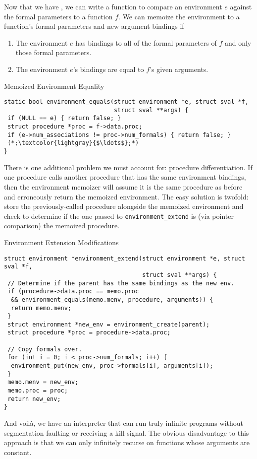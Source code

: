 Now that we have , we can write a function to compare an environment  $e$ against the formal parameters to a function $f$. We can memoize the environment to a function's formal parameters and new argument bindings if
\begin{enumerate}
    \item The environment $e$ has bindings to all of the formal parameters of $f$ and only those formal parameters.
    \item The environment $e$'s bindings are equal to $f$'s given arguments.
\end{enumerate}

\begin{cl}[env.c]{Memoized Environment Equality}
\begin{lstlisting}[language=MyC]
static bool environment_equals(struct environment *e, struct sval *f, 
                               struct sval **args) {
 if (NULL == e) { return false; }
 struct procedure *proc = f->data.proc;
 if (e->num_associations != proc->num_formals) { return false; }
 (*;\textcolor{lightgray}{$\ldots$};*)
}
\end{lstlisting}
\end{cl}

There is one additional problem we must account for: procedure differentiation. If one procedure calls another procedure that has the same environment bindings, then the environment memoizer will assume it is the same procedure as before and erroneously return the memoized environment. The easy solution is twofold: store the previously-called procedure alongside the memoized environment and check to determine if the one passed to \texttt{environment\_extend} is (via pointer comparison) the memoized procedure.

\begin{cl}[env.c]{Environment Extension Modifications}
\begin{lstlisting}[language=MyC]
struct environment *environment_extend(struct environment *e, struct sval *f, 
                                       struct sval **args) {
 // Determine if the parent has the same bindings as the new env.
 if (procedure->data.proc == memo.proc 
  && environment_equals(memo.menv, procedure, arguments)) {
  return memo.menv;
 }
 struct environment *new_env = environment_create(parent);
 struct procedure *proc = procedure->data.proc;

 // Copy formals over.
 for (int i = 0; i < proc->num_formals; i++) {
  environment_put(new_env, proc->formals[i], arguments[i]);
 }
 memo.menv = new_env;
 memo.proc = proc;
 return new_env;
}
\end{lstlisting}
\end{cl}

And voil\`a, we have an interpreter that can run truly infinite programs without segmentation faulting or receiving a kill signal. The obvious disadvantage to this approach is that we can only infinitely recurse on functions whose arguments are constant.
